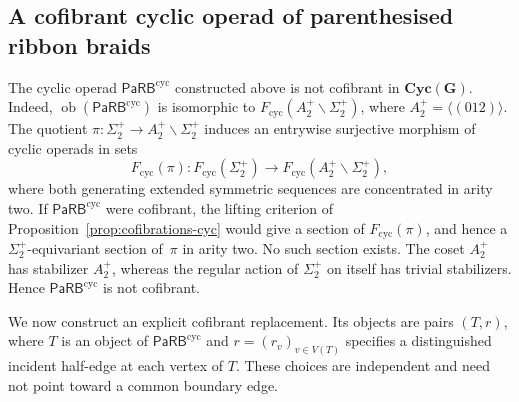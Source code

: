 \documentclass{amsart}
\newcommand{\Grpd}{\mathbf{G}}
\newcommand{\CoRB}{\mathsf{CoRB}}
\newcommand{\PaRB}{\mathsf{PaRB}}
\newcommand{\Cyc}{\mathbf{Cyc}}
\newcommand{\ob}{\operatorname{ob}}
\theoremstyle{definition}
\numberwithin{equation}{section}
\begin{document}

\subsection{A cofibrant cyclic operad of parenthesised ribbon braids}
\label{subsec: cofibrant cyclic PaRB}

The cyclic operad $\PaRB^{\mathrm{cyc}}$ constructed above is not
cofibrant in $\Cyc(\Grpd)$. Indeed,
$\ob(\PaRB^{\mathrm{cyc}})$ is isomorphic to
$F_{\mathrm{cyc}}(A_2^+\backslash\Sigma_2^+)$, where
$A_2^+=\langle(012)\rangle$. The quotient
$\pi\colon\Sigma_2^+\to A_2^+\backslash\Sigma_2^+$ induces an
entrywise surjective morphism of cyclic operads in sets
\[
F_{\mathrm{cyc}}(\pi)\colon
F_{\mathrm{cyc}}(\Sigma_2^+)
\longrightarrow
F_{\mathrm{cyc}}(A_2^+\backslash\Sigma_2^+),
\]
where both generating extended symmetric sequences are concentrated
in arity two. If $\PaRB^{\mathrm{cyc}}$ were cofibrant, the lifting
criterion of Proposition~\ref{prop:cofibrations-cyc} would give a
section of $F_{\mathrm{cyc}}(\pi)$, and hence a
$\Sigma_2^+$-equivariant section of~$\pi$ in arity two.
No such section exists. The coset $A_2^+$ has stabilizer $A_2^+$,
whereas the regular action of $\Sigma_2^+$ on itself has trivial
stabilizers. Hence $\PaRB^{\mathrm{cyc}}$ is not cofibrant.

We now construct an explicit cofibrant replacement. Its objects are
pairs $(T,r)$, where $T$ is an object of
$\PaRB^{\mathrm{cyc}}$ and $r=(r_v)_{v\in V(T)}$ specifies a
distinguished incident half-edge at each vertex of $T$. These choices
are independent and need not point toward a common boundary edge.
\end{document}
